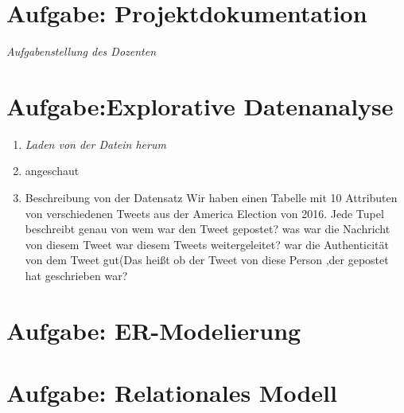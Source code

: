 
\newcommand{\dozent}{Prof.  Dr.  Agnès Voisard, Nicolas Lehmann}					%
\newcommand{\tutor}{Hoffman Christian}						%
\newcommand{\tutoriumNo}{Tutorium 3}				%
\newcommand{\projectNo}{1}									%
\newcommand{\veranstaltung}{Datenbank Systeme}	%
\newcommand{\semester}{SoeSe 2017}						%
\newcommand{\studenten}{IngridTchilibou,Emil,Boyan Hristov}			%





\section{Aufgabe: Projektdokumentation}
{\itshape Aufgabenstellung des Dozenten}



\section{Aufgabe:Explorative Datenanalyse}
\begin{enumerate}[1)]
\item {\itshape Laden von der Datein herum}
\item{angeschaut}
\item{Beschreibung von der Datensatz}
Wir haben einen Tabelle mit 10 Attributen von verschiedenen Tweets aus der America Election von 2016. Jede Tupel beschreibt genau von wem war den Tweet gepostet? was war die Nachricht von diesem Tweet war diesem Tweets weitergeleitet? war die Authenticität von dem Tweet gut(Das heißt ob der Tweet von diese Person ,der gepostet hat geschrieben war?

\end{enumerate}

\section{Aufgabe: ER-Modelierung}

\section{Aufgabe: Relationales Modell}

